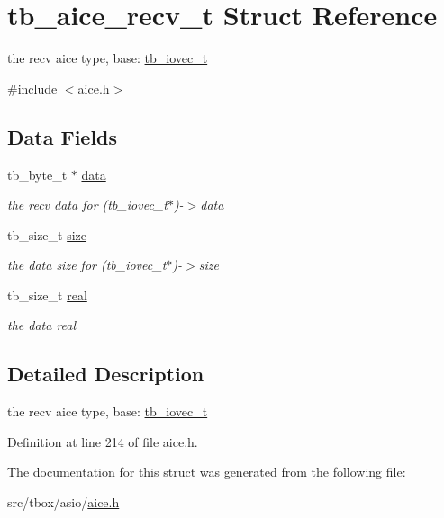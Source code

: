 \hypertarget{structtb__aice__recv__t}{\section{tb\-\_\-aice\-\_\-recv\-\_\-t Struct Reference}
\label{structtb__aice__recv__t}
}


the recv aice type, base\-: \hyperlink{structtb__iovec__t}{tb\-\_\-iovec\-\_\-t}  




{\ttfamily \#include $<$aice.\-h$>$}

\subsection*{Data Fields}
\begin{DoxyCompactItemize}
\item 
\hypertarget{structtb__aice__recv__t_a6e04e5041f558f00d37249281544aaea}{tb\-\_\-byte\-\_\-t $\ast$ \hyperlink{structtb__aice__recv__t_a6e04e5041f558f00d37249281544aaea}{data}}\label{structtb__aice__recv__t_a6e04e5041f558f00d37249281544aaea}

\begin{DoxyCompactList}\small\item\em the recv data for (tb\-\_\-iovec\-\_\-t$\ast$)-\/$>$data \end{DoxyCompactList}\item 
\hypertarget{structtb__aice__recv__t_ae08b30284cad982008501b08c8b9f6cf}{tb\-\_\-size\-\_\-t \hyperlink{structtb__aice__recv__t_ae08b30284cad982008501b08c8b9f6cf}{size}}\label{structtb__aice__recv__t_ae08b30284cad982008501b08c8b9f6cf}

\begin{DoxyCompactList}\small\item\em the data size for (tb\-\_\-iovec\-\_\-t$\ast$)-\/$>$size \end{DoxyCompactList}\item 
\hypertarget{structtb__aice__recv__t_a2704daf4557283bf73a07edb58aa3665}{tb\-\_\-size\-\_\-t \hyperlink{structtb__aice__recv__t_a2704daf4557283bf73a07edb58aa3665}{real}}\label{structtb__aice__recv__t_a2704daf4557283bf73a07edb58aa3665}

\begin{DoxyCompactList}\small\item\em the data real \end{DoxyCompactList}\end{DoxyCompactItemize}


\subsection{Detailed Description}
the recv aice type, base\-: \hyperlink{structtb__iovec__t}{tb\-\_\-iovec\-\_\-t} 

Definition at line 214 of file aice.\-h.



The documentation for this struct was generated from the following file\-:\begin{DoxyCompactItemize}
\item 
src/tbox/asio/\hyperlink{aice_8h}{aice.\-h}\end{DoxyCompactItemize}

